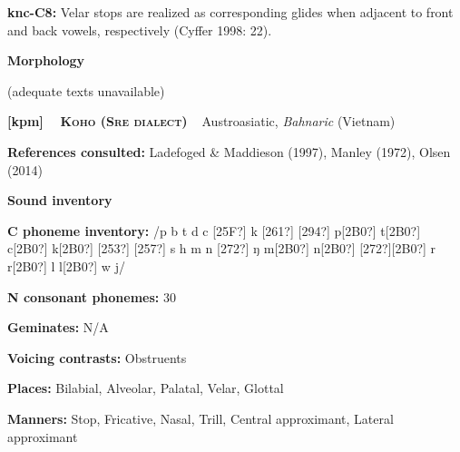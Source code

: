 \begin{styleBody}
\textbf{knc-C8: }Velar stops are realized as corresponding glides when adjacent to front and back vowels, respectively (Cyffer 1998: 22).
\end{styleBody}

\begin{styleBody}
\textbf{Morphology}
\end{styleBody}

\begin{styleBody}
(adequate texts unavailable)
\end{styleBody}

\clearpage\begin{styleBody}
\textbf{[kpm] }\ \ \textbf{\textsc{Koho (Sre dialect)}}\textbf{\ \ }Austroasiatic, \textit{Bahnaric} (Vietnam)
\end{styleBody}

\begin{styleBody}
\textbf{References consulted: }Ladefoged \& Maddieson (1997), Manley (1972), Olsen (2014)
\end{styleBody}

\begin{styleBody}
\textbf{Sound inventory}
\end{styleBody}

\begin{styleBody}
\textbf{C phoneme inventory:} /p b t d c [25F?] k [261?] [294?] p[2B0?] t[2B0?] c[2B0?] k[2B0?] [253?] [257?] s h m n [272?] ŋ m[2B0?] n[2B0?] [272?][2B0?] r r[2B0?] l l[2B0?] w j/
\end{styleBody}

\begin{styleBody}
\textbf{N consonant phonemes:} 30
\end{styleBody}

\begin{styleBody}
\textbf{Geminates:} N/A
\end{styleBody}

\begin{styleBody}
\textbf{Voicing contrasts:} Obstruents
\end{styleBody}

\begin{styleBody}
\textbf{Places:} Bilabial, Alveolar, Palatal, Velar, Glottal
\end{styleBody}

\begin{styleBody}
\textbf{Manners:} Stop, Fricative, Nasal, Trill, Central approximant, Lateral approximant
\end{styleBody}

